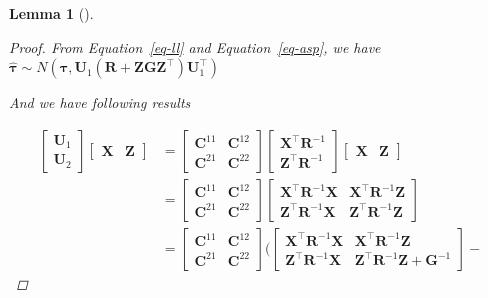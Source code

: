 \documentclass[
  a4paper,
  oneside,
  openany,
  12pt,
  onecolumn]{book}
\theoremstyle{definition}
\theoremstyle{definition}
\theoremstyle{plain}
\newtheorem{lemma}{Lemma}[chapter]
\theoremstyle{remark}
\begin{document}
\begin{lemma}[]
\begin{proof}
From Equation~\ref{eq-ll} and Equation~\ref{eq-asp}, we have
\(\hat{\boldsymbol{\tau}}\sim N(\boldsymbol{\tau},\boldsymbol{U}_1(\boldsymbol{R}+\boldsymbol{ZGZ}^\top)\boldsymbol{U}_1^\top)\)

And we have following results

\[\begin{aligned}
\begin{bmatrix}
\boldsymbol{U}_1 \\
\boldsymbol{U}_2
\end{bmatrix}
\begin{bmatrix}
\boldsymbol{X} & \boldsymbol{Z}
\end{bmatrix}
&=
\begin{bmatrix}
\boldsymbol{C}^{11} & \boldsymbol{C}^{12} \\
\boldsymbol{C}^{21} & \boldsymbol{C}^{22}
\end{bmatrix}
\begin{bmatrix}
\boldsymbol{X}^\top\boldsymbol{R}^{-1}\\
\boldsymbol{Z}^\top\boldsymbol{R}^{-1}
\end{bmatrix}
\begin{bmatrix}
\boldsymbol{X} & \boldsymbol{Z}
\end{bmatrix}\\
&=
\begin{bmatrix}
\boldsymbol{C}^{11} & \boldsymbol{C}^{12} \\
\boldsymbol{C}^{21} & \boldsymbol{C}^{22}
\end{bmatrix}
\begin{bmatrix}
\boldsymbol{X}^\top\boldsymbol{R}^{-1}\boldsymbol{X} & \boldsymbol{X}^\top\boldsymbol{R}^{-1}\boldsymbol{Z}\\
\boldsymbol{Z}^\top\boldsymbol{R}^{-1}\boldsymbol{X} & \boldsymbol{Z}^\top\boldsymbol{R}^{-1}\boldsymbol{Z}
\end{bmatrix}\\
&=
\begin{bmatrix}
\boldsymbol{C}^{11} & \boldsymbol{C}^{12} \\
\boldsymbol{C}^{21} & \boldsymbol{C}^{22}
\end{bmatrix}
(
\begin{bmatrix}
\boldsymbol{X}^\top\boldsymbol{R}^{-1}\boldsymbol{X} & \boldsymbol{X}^\top\boldsymbol{R}^{-1}\boldsymbol{Z}\\
\boldsymbol{Z}^\top\boldsymbol{R}^{-1}\boldsymbol{X} & \boldsymbol{Z}^\top\boldsymbol{R}^{-1}\boldsymbol{Z}+\boldsymbol{G}^{-1}
\end{bmatrix}-

\end{aligned}\]
\end{proof}
\end{lemma}
\end{document}
